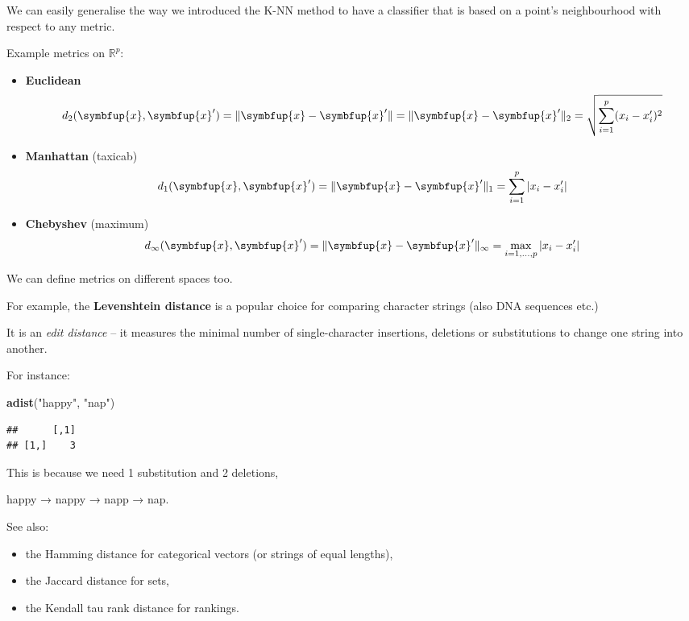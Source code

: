 \documentclass[10pt,b5paper,krantz1]{krantz}
\newenvironment{Shaded}{\begin{snugshade}}{\end{snugshade}}
\newcommand{\KeywordTok}[1]{\textcolor[rgb]{0.27,0.27,0.27}{\textbf{#1}}}
\newcommand{\NormalTok}[1]{#1}
\newcommand{\StringTok}[1]{\textcolor[rgb]{0.5,0.5,0.5}{#1}}
\providecommand{\tightlist}{%
  \setlength{\itemsep}{0pt}\setlength{\parskip}{0pt}}
\renewcommand{\mathbf}[1]{\symbfup{#1}}
\begin{document}
We can easily generalise the way we introduced the K-NN method
to have a classifier that is based on a point's neighbourhood
with respect to any metric.

Example metrics on \(\mathbb{R}^p\):

\begin{itemize}
\tightlist
\item
  \textbf{Euclidean}
  \[
  d_2(\mathbf{x}, \mathbf{x}') = \| \mathbf{x}-\mathbf{x}' \| = \| \mathbf{x}-\mathbf{x}' \|_2 = \sqrt{ \sum_{i=1}^p (x_i-x_i')^2 }
  \]
\item
  \textbf{Manhattan} (taxicab)
  \[
  d_1(\mathbf{x}, \mathbf{x}') = \| \mathbf{x}-\mathbf{x}' \|_1 = { \sum_{i=1}^p |x_i-x_i'| }
  \]
\item
  \textbf{Chebyshev} (maximum)
  \[
  d_\infty(\mathbf{x}, \mathbf{x}') = \| \mathbf{x}-\mathbf{x}' \|_\infty = \max_{i=1,\dots,p} |x_i-x_i'|
  \]
\end{itemize}

We can define metrics on different spaces too.

For example, the \textbf{Levenshtein distance} is a popular choice
for comparing character strings (also DNA sequences etc.)

It is an \emph{edit distance} -- it measures the minimal number of
single-character insertions, deletions or substitutions to change
one string into another.

For instance:

\begin{Shaded}
\begin{Highlighting}[]
\KeywordTok{adist}\NormalTok{(}\StringTok{"happy"}\NormalTok{, }\StringTok{"nap"}\NormalTok{)}
\end{Highlighting}
\end{Shaded}

\begin{verbatim}
##      [,1]
## [1,]    3
\end{verbatim}

This is because we need 1 substitution and 2 deletions,

happy → nappy → napp → nap.

See also:

\begin{itemize}
\tightlist
\item
  the Hamming distance for categorical vectors (or strings of equal lengths),
\item
  the Jaccard distance for sets,
\item
  the Kendall tau rank distance for rankings.
\end{itemize}
\end{document}

